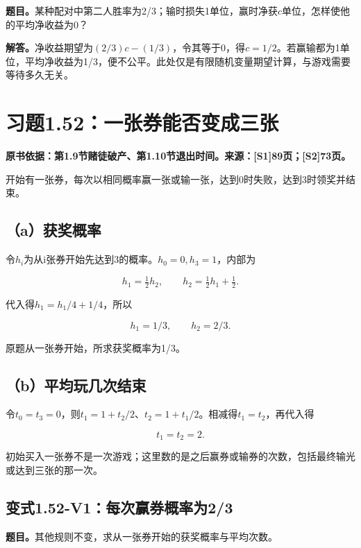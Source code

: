 \documentclass[
  11pt,
  a4paper,
  UTF8,
  fontset=fandol]{ctexart}
\begin{document}
\textbf{题目。}某种配对中第二人胜率为2/3；输时损失1单位，赢时净获\(c\)单位，怎样使他的平均净收益为0？

\textbf{解答。}净收益期望为\((2/3)c-(1/3)\)，令其等于0，得\(\boxed{c=1/2}\)。若赢输都为1单位，平均净收益为1/3，便不公平。此处仅是有限随机变量期望计算，与游戏需要等待多久无关。

\section{习题1.52：一张券能否变成三张}\label{ux4e60ux98981.52ux4e00ux5f20ux5238ux80fdux5426ux53d8ux6210ux4e09ux5f20}

\textbf{原书依据：第1.9节赌徒破产、第1.10节退出时间。来源：{[}S1{]}89页；{[}S2{]}73页。}

开始有一张券，每次以相同概率赢一张或输一张，达到0时失败，达到3时领奖并结束。

\subsection{（a）获奖概率}\label{aux83b7ux5956ux6982ux7387}

令\(h_i\)为从i张券开始先达到3的概率。\(h_0=0,h_3=1\)，内部为

\[
h_1=\tfrac12h_2,\qquad h_2=\tfrac12h_1+\tfrac12.
\]

代入得\(h_1=h_1/4+1/4\)，所以

\[
\boxed{h_1=1/3,\qquad h_2=2/3.}
\]

原题从一张券开始，所求获奖概率为1/3。

\subsection{（b）平均玩几次结束}\label{bux5e73ux5747ux73a9ux51e0ux6b21ux7ed3ux675f}

令\(t_0=t_3=0\)，则\(t_1=1+t_2/2\)、\(t_2=1+t_1/2\)。相减得\(t_1=t_2\)，再代入得

\[
\boxed{t_1=t_2=2.}
\]

初始买入一张券不是一次游戏；这里数的是之后赢券或输券的次数，包括最终输光或达到三张的那一次。

\subsection{变式1.52-V1：每次赢券概率为2/3}\label{ux53d8ux5f0f1.52-v1ux6bcfux6b21ux8d62ux5238ux6982ux7387ux4e3a23}

\textbf{题目。}其他规则不变，求从一张券开始的获奖概率与平均次数。
\end{document}
